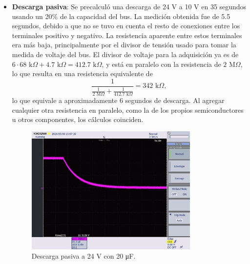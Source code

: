 \begin{itemize}
	\item \textbf{Descarga pasiva}: Se precalculó una descarga de 24 V a 10 V en 35 segundos usando un 20\% de la capacidad del bus. La medición obtenida fue de 5.5 segundos, debido a que no se tuvo en cuenta el resto de conexiones entre los terminales positivo y negativo. La resistencia aparente entre estos terminales era más baja, principalmente por el divisor de tensión usado para tomar la medida de voltaje del bus. El divisor de voltaje para la adquisición ya es de $6 \cdot 68 \text{ k}\Omega + 4.7 \text{ k}\Omega = 412.7 \text{ k}\Omega$, y está en paralelo con la resistencia de $2 \text{ M}\Omega$, lo que resulta en una resistencia equivalente de 
	$$
	\frac{1}{\frac{1}{2 \text{ M}\Omega} + \frac{1}{412.7 \text{ k}\Omega}} = 342 \text{ k}\Omega,
	$$
	lo que equivale a aproximadamente 6 segundos de descarga. Al agregar cualquier otra resistencia en paralelo, como la de los propios semiconductores u otros componentes, los cálculos coinciden.
	
	\begin{figure}[H]
		\centering
		\includegraphics[width=0.7\linewidth]{fig/discharge1}
		\caption{Descarga pasiva a 24 V con 20 \unit{\micro\farad}.}
	\end{figure}
	

\end{itemize}
